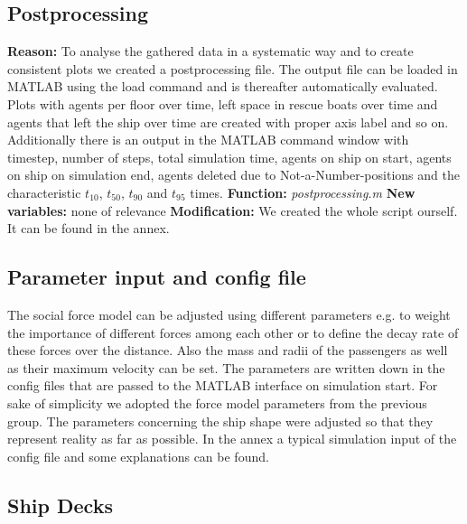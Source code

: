 \documentclass[11pt]{article}
\begin{document}
\subsection{Postprocessing}
\textbf{Reason:}
\newline
To analyse the gathered data in a systematic way and to create consistent plots we created a postprocessing file. The output file can be loaded in MATLAB using the load command and is thereafter automatically evaluated. Plots with agents per floor over time, left space in rescue boats over time and agents that left the ship over time are created with proper axis label and so on. Additionally there is an output in the MATLAB command window with timestep, number of steps, total simulation time, agents on ship on start, agents on ship on simulation end, agents deleted due to Not-a-Number-positions and the characteristic $t_{10}$, $t_{50}$, $t_{90}$ and $t_{95}$ times.
\newline
\textbf{Function:}
\newline
\textit{postprocessing.m}
\newline
\textbf{New variables:}
\newline
none of relevance
\newline
\textbf{Modification:}
\newline
We created the whole script ourself. It can be found in the annex.
\subsection{Parameter input and config file}
The social force model can be adjusted using different parameters e.g. to weight the importance of different forces among each other or to define the decay rate of these forces over the distance. Also the mass and radii of the passengers as well as their maximum velocity can be set. The parameters are written down in the config files that are passed to the MATLAB interface on simulation start. For sake of simplicity we adopted the force model parameters from the previous group. The parameters concerning the ship shape were adjusted so that they represent reality as far as possible.
\newline
In the annex a typical simulation input of the config file and some explanations can be found.

\subsection{Ship Decks}
\end{document}
